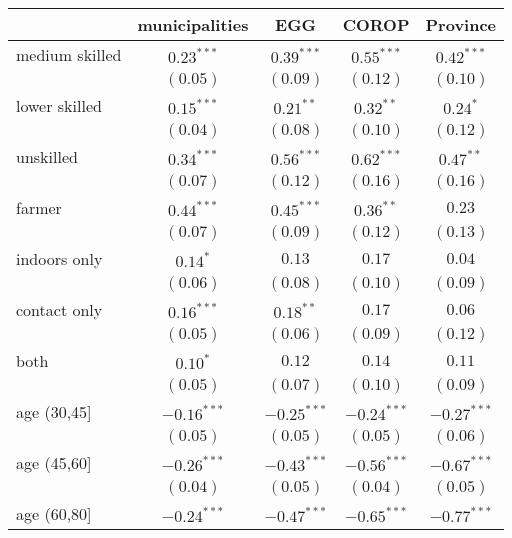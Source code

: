 
\begin{table}[h!]
\begin{center}
\begin{small}
\begin{tabular}{l c c c c}
\hline
 & municipalities & EGG & COROP & Province \\
\hline
medium skilled & $0.23^{***}$  & $0.39^{***}$  & $0.55^{***}$  & $0.42^{***}$  \\
               & $(0.05)$      & $(0.09)$      & $(0.12)$      & $(0.10)$      \\
lower skilled  & $0.15^{***}$  & $0.21^{**}$   & $0.32^{**}$   & $0.24^{*}$    \\
               & $(0.04)$      & $(0.08)$      & $(0.10)$      & $(0.12)$      \\
unskilled      & $0.34^{***}$  & $0.56^{***}$  & $0.62^{***}$  & $0.47^{**}$   \\
               & $(0.07)$      & $(0.12)$      & $(0.16)$      & $(0.16)$      \\
farmer         & $0.44^{***}$  & $0.45^{***}$  & $0.36^{**}$   & $0.23$        \\
               & $(0.07)$      & $(0.09)$      & $(0.12)$      & $(0.13)$      \\
indoors only   & $0.14^{*}$    & $0.13$        & $0.17$        & $0.04$        \\
               & $(0.06)$      & $(0.08)$      & $(0.10)$      & $(0.09)$      \\
contact only   & $0.16^{***}$  & $0.18^{**}$   & $0.17$        & $0.06$        \\
               & $(0.05)$      & $(0.06)$      & $(0.09)$      & $(0.12)$      \\
both           & $0.10^{*}$    & $0.12$        & $0.14$        & $0.11$        \\
               & $(0.05)$      & $(0.07)$      & $(0.10)$      & $(0.09)$      \\
age (30,45]    & $-0.16^{***}$ & $-0.25^{***}$ & $-0.24^{***}$ & $-0.27^{***}$ \\
               & $(0.05)$      & $(0.05)$      & $(0.05)$      & $(0.06)$      \\
age (45,60]    & $-0.26^{***}$ & $-0.43^{***}$ & $-0.56^{***}$ & $-0.67^{***}$ \\
               & $(0.04)$      & $(0.05)$      & $(0.04)$      & $(0.05)$      \\
age (60,80]    & $-0.24^{***}$ & $-0.47^{***}$ & $-0.65^{***}$ & $-0.77^{***}$ \\

\end{tabular}
\end{small}
\end{center}
\end{table}
